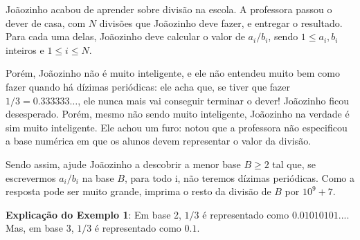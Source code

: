 %

Joãozinho acabou de aprender sobre divisão na escola. A professora passou o dever de casa, com $N$ divisões que Joãozinho deve fazer, e entregar o resultado. Para cada uma delas, Joãozinho deve calcular o valor de $a_i / b_i$, sendo $1 \leq a_i, b_i$ inteiros e $1 \leq i \leq N$.

Porém, Joãozinho não é muito inteligente, e ele não entendeu muito bem como fazer quando há dízimas periódicas: ele acha que, se tiver que fazer $1 / 3 = 0.333333\dots$, ele nunca mais vai conseguir terminar o dever! Joãozinho ficou desesperado. Porém, mesmo não sendo muito inteligente, Joãozinho na verdade é sim muito inteligente. Ele achou um furo: notou que a professora não especificou a base numérica em que os alunos devem representar o valor da divisão.

Sendo assim, ajude Joãozinho a descobrir a menor base $B \geq 2$ tal que, se escrevermos $a_i / b_i$ na base $B$, para todo i, não teremos dízimas periódicas. Como a resposta pode ser muito grande, imprima o resto da divisão de $B$ por $10^9+7$.

%
%


%
%



\sampleio

\bigskip
\textbf{Explicação do Exemplo 1}: Em base 2, $1/3$ é representado como $0.01010101...$. Mas, em base 3, $1/3$ é representado como $0.1$.
